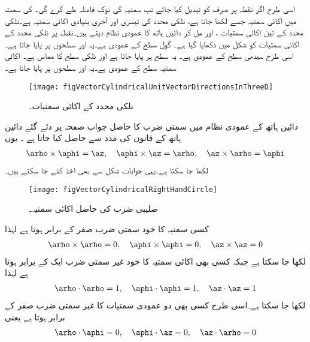 اسی طرح اگر نقطہ  پر صرف  کو  تبدیل کیا جائے تب سمتیہ کی نوک  فاصلہ طے کرے گی۔  کی سمت میں اکائی سمتیہ جسے  لکھا جاتا ہے، نلکی محدد کی تیسری اور آخری بنیادی اکائی سمتیہ ہے۔نلکی محدد کے تین اکائی سمتیات ،  اور  مل کر دائیں ہاتھ کا عمودی  نظام دیتے ہیں۔نقطہ  پر نلکی محدد کے اکائی سمتیات کو شکل  میں دکھایا گیا ہے۔ گول سطح  کے عمودی ہے۔یہ  اور  سطحوں پر پایا جاتا ہے۔اسی طرح  سیدھی سطح   کے عمودی ہے۔ یہ  سطح پر پایا جاتا ہے اور  نلکی سطح کا مماس ہے۔ اکائی سمتیہ  سطح کے عمودی ہے۔یہ  اور  سطحوں پر پایا جاتا ہے۔ 
\begin{figure}
\centering
\texttt{[image: figVectorCylindricalUnitVectorDirectionsInThreeD]}
\caption{نلکی محدد کے اکائی سمتیات۔}
\label{شکل_سمتیہ_نلکی_اکائی_سمتیات_عمومی}
\end{figure}

دائیں ہاتھ کے عمودی نظام میں سمتی ضرب کا حاصل جواب صفحہ  پر دئے گئے دائیں ہاتھ کے قانون کی مدد سے حاصل کیا جاتا ہے ۔ یوں
\begin{align}\label{مساوات_سمتیات_نلکی_اکائی_سمتیات_کا_سمتی_ضرب}
\arho \times \aphi=\az, \quad \aphi \times \az=\arho, \quad \az \times \arho=\aphi
\end{align}
لکھا جا سکتا ہے۔یہی جوابات شکل  سے بھی اخذ کئے جا سکتے ہیں۔
\begin{figure}
\centering
\texttt{[image: figVectorCylindricalRightHandCircle]}
\caption{صلیبی ضرب کی حاصل اکائی سمتیہ۔}
\label{شکل_سمتیہ_نلکی_صلیبی_ضرب_مثبت_دائرہ}
\end{figure}

کسی سمتیہ کا خود سمتی ضرب صفر کے برابر ہوتا ہے لہٰذا
\begin{align}\label{مساوات_سمتیات_نلکی_اکائی_سمتیات_کا_سمتی_ضرب_ب}
\arho \times \arho=0, \quad \aphi \times \aphi =0, \quad \az \times \az=0
\end{align}
لکھا جا سکتا ہے جبکہ کسی بھی اکائی سمتیہ کا خود غیر سمتی ضرب ایک کے برابر ہوتا ہے لہٰذا 
\begin{align}
\arho \cdot \arho=1, \quad \aphi \cdot \aphi =1, \quad \az \cdot \az =1
\end{align}
لکھا جا سکتا ہے۔اسی طرح کسی بھی دو عمودی سمتیات  کا غیر سمتی ضرب صفر کے برابر ہوتا ہے یعنی
\begin{align}
\arho \cdot \aphi=0, \quad \aphi \cdot \az =0, \quad \az \cdot \arho =0
\end{align}

